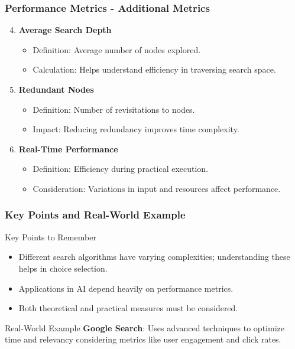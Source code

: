 \documentclass[aspectratio=169]{beamer}
\begin{document}
\begin{frame}[fragile]
    \frametitle{Performance Metrics - Additional Metrics}
    \begin{enumerate}
        \setcounter{enumi}{3}
        \item \textbf{Average Search Depth}
        \begin{itemize}
            \item Definition: Average number of nodes explored.
            \item Calculation: Helps understand efficiency in traversing search space.
        \end{itemize}

        \item \textbf{Redundant Nodes}
        \begin{itemize}
            \item Definition: Number of revisitations to nodes.
            \item Impact: Reducing redundancy improves time complexity.
        \end{itemize}

        \item \textbf{Real-Time Performance}
        \begin{itemize}
            \item Definition: Efficiency during practical execution.
            \item Consideration: Variations in input and resources affect performance.
        \end{itemize}
    \end{enumerate}
\end{frame}

\begin{frame}[fragile]
    \frametitle{Key Points and Real-World Example}
    \begin{block}{Key Points to Remember}
        \begin{itemize}
            \item Different search algorithms have varying complexities; understanding these helps in choice selection.
            \item Applications in AI depend heavily on performance metrics.
            \item Both theoretical and practical measures must be considered.
        \end{itemize}
    \end{block}

    \begin{block}{Real-World Example}
        \textbf{Google Search}: Uses advanced techniques to optimize time and relevancy considering metrics like user engagement and click rates.
    \end{block}
\end{frame}
\end{document}
